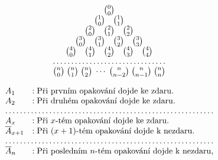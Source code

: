 \documentclass{article}
\begin{document}
\begin{align*}
  \begin{array}{c} 
    \binom{0}{0}                                                                              \\
    \binom{1}{0}\quad \binom{1}{1}                                                            \\  
    \binom{2}{0}\quad \binom{2}{1}\quad \binom{2}{2}                                          \\ 
    \binom{3}{0}\quad \binom{3}{1}\quad \binom{3}{2}\quad \binom{3}{3}                        \\ 
    \binom{4}{0}\quad \binom{4}{1}\quad \binom{4}{2}\quad \binom{4}{3}\quad  \binom{4}{4}     \\ 
    \hdotsfor{1}                                                                              \\
    \binom{n}{0}\; \binom{n}{1}\; \binom{n}{2}\; \cdots\; 
    \binom{n}{n-2}\; \binom{n}{n-1}\; \binom{n}{n}                                            \\ 
  \end{array}
\end{align*}

\begin{gather*}
  \begin{array}{ll}
    A_1                &: \text{Při prvním opakování dojde ke zdaru.}                  \\
    A_2                &: \text{Při druhém opakování dojde ke zdaru.}                  \\
    \hdotsfor{2}                                                                       \\
    A_x                &: \text{Při \(x\)-tém opakování dojde ke zdaru.}               \\
    \overline{A}_{x+1} &: \text{Při \((x + 1)\)-tém opakování dojde k nezdaru.}        \\
    \hdotsfor{2}                                                                       \\
    \overline{A}_n     &: \text{Při posledním \(n\)-tém opakování dojde k nezdaru,}
  \end{array}
\end{gather*}
\end{document}
